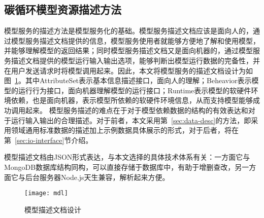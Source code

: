\subsection{碳循环模型资源描述方法}
\label{sec:ms-desc}
模型服务的描述方法是模型服务化的基础。模型服务描述文档应该是面向人的，通过模型服务描述文档提供的信息，模型服务使用者就能够方便地了解和使用模型，并能够理解模型的返回结果；同时模型服务描述文档又是面向机器的，通过模型服务描述文档提供的模型运行输入输出选项，能够判断出模型运行数据的完备性，并在用户发送请求时将模型调用起来。因此，本文将模型服务的描述文档设计为如图~\ref{fig:mdl}。其中AttributeSet表示基本信息描述接口，面向人的理解；Beheavior表示模型的运行行为接口，面向机器理解模型的运行接口；Runtime表示模型的软硬件环境依赖，也是面向机器，表示模型所依赖的软硬件环境信息，从而支持模型能够成功调用起来。
模型服务描述的难点在于对于模型依赖数据的结构的有效表达和对于运行输入输出的合理描述。对于前者，本文采用第~\ref{sec:data-desc}的方法，即采用领域通用标准数据的描述加上示例数据具体展示的形式，对于后者，将在第~\ref{sec:io-interface}节介绍。


模型描述文档由JSON形式表达，与本文选择的具体技术体系有关：一方面它与MongoDB数据库结构同构，可以直接存储于数据库中，有助于增删查改，另一方面它与后台服务器Node.js天生兼容，解析起来方便。

\begin{figure}[!htbp]
    \centering
    \texttt{[image: mdl]}
    \caption{模型描述文档设计}
    \label{fig:mdl}
\end{figure}

